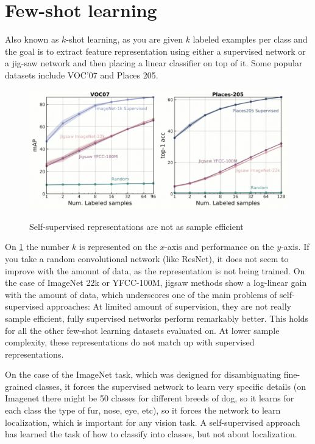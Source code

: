 \section{Few-shot learning}

Also known as $k$-shot learning, as you are given $k$ labeled examples per class and the goal is to extract feature representation using either a supervised network or a jig-saw network and then placing a linear classifier on top of it. Some popular datasets include VOC’07 and Places 205.

\begin{figure}[htb!]
\centering
\includegraphics[width=0.8\linewidth]{lectures/14-b/graphics/Self_supervised.png}
\label{fig:Self_supervised}
\caption{Self-supervised representations are not as sample efficient}
\end{figure}



On \ref{fig:Self_supervised} the number $k$ is represented on the $x$-axis and performance on the $y$-axis. If you take a random convolutional network (like ResNet), it does not seem to improve with the amount of data, as the representation is not being trained. On the case of ImageNet 22k or YFCC-100M, jigsaw methods show a log-linear gain with the amount of data, which underscores one of the main problems of self-supervised approaches: At limited amount of supervision, they are not really sample efficient, fully supervised networks perform remarkably better. This holds for all the other few-shot learning datasets evaluated on. At lower sample complexity, these representations do not match up with supervised representations.

On the case of the ImageNet task, which was designed for disambiguating fine-grained classes, it forces the supervised network to learn very specific details (on Imagenet there might be 50 classes for different breeds of dog, so it learns for each class the type of fur, nose, eye, etc), so it forces the network to learn localization, which is important for any vision task. A self-supervised approach has learned the task of how to classify into classes, but not about localization.

